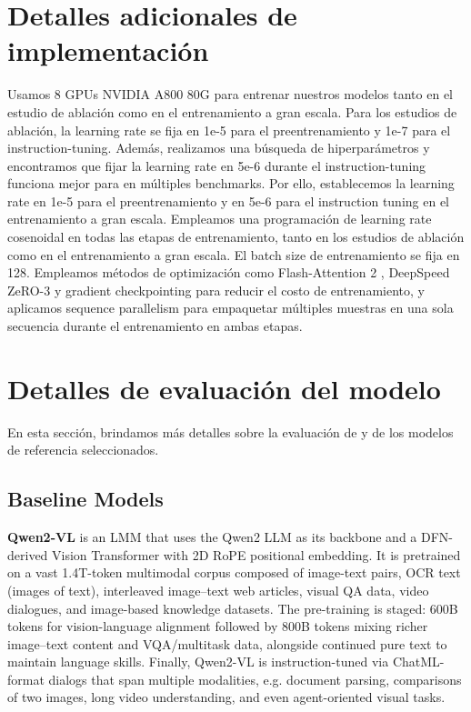 \clearpage
\setcounter{page}{1}
\maketitlesupplementary


\section{Detalles adicionales de implementación}
\label{sec:additional_implementation}
Usamos 8 GPUs NVIDIA A800 80G para entrenar nuestros modelos tanto en el estudio de ablación como en el entrenamiento a gran escala. Para los estudios de ablación, la learning rate se fija en 1e-5 para el preentrenamiento y 1e-7 para el instruction-tuning. Además, realizamos una búsqueda de hiperparámetros y encontramos que fijar la learning rate en 5e-6 durante el instruction-tuning funciona mejor para \model en múltiples benchmarks. Por ello, establecemos la learning rate en 1e-5 para el preentrenamiento y en 5e-6 para el instruction tuning en el entrenamiento a gran escala. Empleamos una programación de learning rate cosenoidal en todas las etapas de entrenamiento, tanto en los estudios de ablación como en el entrenamiento a gran escala. El batch size de entrenamiento se fija en 128. Empleamos métodos de optimización como Flash-Attention 2 \cite{dao2023flashattention}, DeepSpeed ZeRO-3 \cite{rajbhandari2020zero} y gradient checkpointing \cite{chen2016training} para reducir el costo de entrenamiento, y aplicamos sequence parallelism para empaquetar múltiples muestras en una sola secuencia durante el entrenamiento en ambas etapas.

\section{Detalles de evaluación del modelo}
En esta sección, brindamos más detalles sobre la evaluación de \model y de los modelos de referencia seleccionados.

\subsection{Baseline Models}

\textbf{Qwen2-VL} \cite{wang2024qwen2} is an LMM that uses the Qwen2 LLM as its backbone and a DFN-derived Vision Transformer with 2D RoPE positional embedding. It is pretrained on a vast 1.4T-token multimodal corpus composed of image-text pairs, OCR text (images of text), interleaved image–text web articles, visual QA data, video dialogues, and image-based knowledge datasets. The pre-training is staged: 600B tokens for vision-language alignment followed by 800B tokens mixing richer image–text content and VQA/multitask data, alongside continued pure text to maintain language skills. Finally, Qwen2-VL is instruction-tuned via ChatML-format dialogs that span multiple modalities, e.g. document parsing, comparisons of two images, long video understanding, and even agent-oriented visual tasks.

